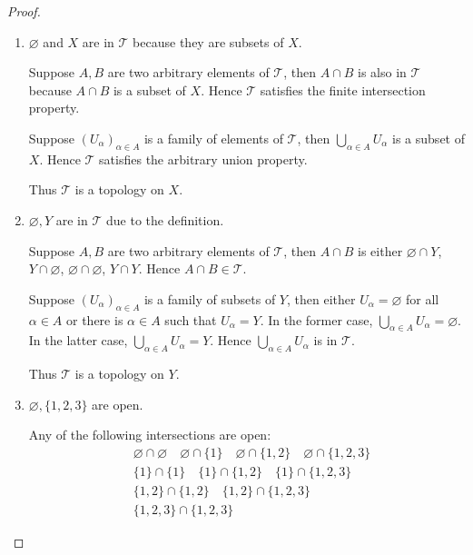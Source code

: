 \begin{proof}
	\begin{enumerate}[label={(\alph*)}]
		\item $\varnothing$ and $X$ are in $\mathscr{T}$ because they are subsets of $X$.

		      Suppose $A, B$ are two arbitrary elements of $\mathscr{T}$, then $A\cap B$ is also in $\mathscr{T}$ because $A\cap B$ is a subset of $X$. Hence $\mathscr{T}$ satisfies the finite intersection property.

		      Suppose ${(U_{\alpha})}_{\alpha\in A}$ is a family of elements of $\mathscr{T}$, then $\bigcup_{\alpha\in A}U_{\alpha}$ is a subset of $X$. Hence $\mathscr{T}$ satisfies the arbitrary union property.

		      Thus $\mathscr{T}$ is a topology on $X$.
		\item $\varnothing, Y$ are in $\mathscr{T}$ due to the definition.

		      Suppose $A, B$ are two arbitrary elements of $\mathscr{T}$, then $A\cap B$ is either $\varnothing\cap Y$, $Y\cap \varnothing$, $\varnothing\cap\varnothing$, $Y\cap Y$. Hence $A\cap B\in\mathscr{T}$.

		      Suppose ${(U_{\alpha})}_{\alpha\in A}$ is a family of subsets of $Y$, then either $U_{\alpha} = \varnothing$ for all $\alpha\in A$ or there is $\alpha\in A$ such that $U_{\alpha} = Y$. In the former case, $\bigcup_{\alpha\in A}U_{\alpha} = \varnothing$. In the latter case, $\bigcup_{\alpha\in A}U_{\alpha} = Y$. Hence $\bigcup_{\alpha\in A}U_{\alpha}$ is in $\mathscr{T}$.

		      Thus $\mathscr{T}$ is a topology on $Y$.
		\item $\varnothing, \{ 1,2,3 \}$ are open.

		      Any of the following intersections are open:
		      \begin{align*}
			       & \varnothing \cap \varnothing \quad \varnothing \cap \{ 1 \} \quad \varnothing \cap \{ 1, 2 \} \quad \varnothing \cap \{ 1, 2, 3 \} \\
			       & \{ 1 \} \cap \{ 1 \} \quad \{ 1 \} \cap \{ 1, 2 \} \quad \{ 1 \} \cap \{ 1, 2, 3 \}                                                \\
			       & \{ 1, 2 \} \cap \{ 1, 2 \} \quad \{ 1, 2 \} \cap \{ 1, 2, 3 \}                                                                     \\
			       & \{ 1, 2, 3 \} \cap \{ 1, 2, 3 \}
		      \end{align*}


\end{enumerate}
\end{proof}
